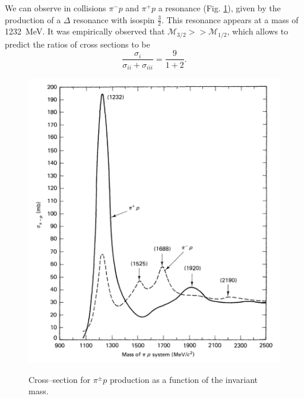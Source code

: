 We can observe in collisions %
    $\pi^- p $ and $\pi^+ p$ a resonance (Fig. \ref{fig:risonanzedelta}), given by the production of a $\Delta$ resonance with isospin $\frac{3}{2}$. This resonance appears at a mass of \SI{1232}{MeV}. It was empirically observed that $\mathcal{M}_{3/2}>>\mathcal{M}_{1/2}$, which allows to predict the ratios of cross sections to be
    \[
      \dfrac{\sigma_i}{\sigma_{ii}+\sigma_{iii}}=\dfrac{9}{1+2}.
    \]
  \begin{figure}[h!]
\begin{center}\label{fig:risonanzedelta}
  \includegraphics[width=12cm]{Figures/Simmetrie-pagine-3.pdf}\\
  \caption{Cross--section for \(\pi^\pm  p\) production as a function of the invariant mass.}
\end{center}
\end{figure}



